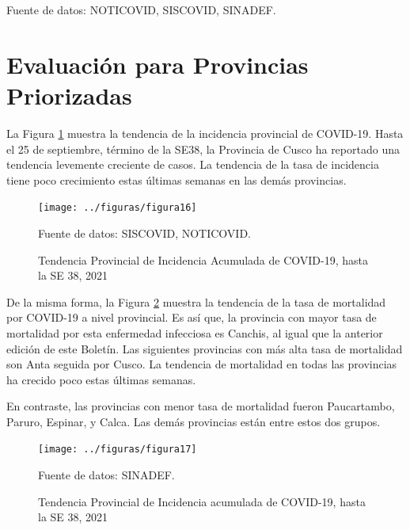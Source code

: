 \documentclass[12pt,a4paper,openany]{book}
\begin{document}
	
	{\footnotesize Fuente de datos: NOTICOVID, SISCOVID, SINADEF.}

	\chapter*{Evaluación para Provincias Priorizadas}
	\noindent La Figura \ref{fig:incidencia_provincias} muestra la tendencia de la incidencia provincial de COVID-19. Hasta el 25 de septiembre, término de la SE38, la Provincia de Cusco ha reportado una tendencia levemente creciente de casos. La tendencia de la tasa de incidencia tiene poco crecimiento estas últimas semanas en las demás provincias.
	
	\begin{figure}[h]
		\caption{Tendencia Provincial de Incidencia Acumulada de COVID-19, hasta la SE 38, 2021}\label{fig:incidencia_provincias}
		\begin{center}
			\texttt{[image: ../figuras/figura16]}
		\end{center}
		{\footnotesize {Fuente de datos: SISCOVID, NOTICOVID.}}
	\end{figure}
	
	De la misma forma, la Figura \ref{fig:mortalidad_provincias} muestra la tendencia de la tasa de mortalidad por COVID-19 a nivel provincial. Es así que, la provincia con mayor tasa de mortalidad por esta enfermedad infecciosa es Canchis, al igual que la anterior edición de este Boletín. Las siguientes provincias con más alta tasa de mortalidad son Anta seguida por Cusco. La tendencia de mortalidad en todas las provincias ha crecido poco estas últimas semanas.
	
	En contraste, las provincias con menor tasa de mortalidad fueron Paucartambo, Paruro, Espinar, y Calca. Las demás provincias están entre estos dos grupos.
	
	\begin{figure}[h]
		\caption{Tendencia Provincial de Incidencia acumulada de COVID-19, hasta la SE 38, 2021}\label{fig:mortalidad_provincias}
		\begin{center}
			\texttt{[image: ../figuras/figura17]}
		\end{center}
		{\footnotesize {Fuente de datos: SINADEF.}}
	\end{figure}
	
\end{document}
